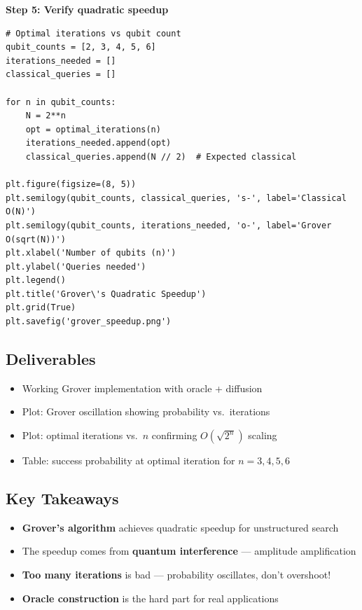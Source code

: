 \documentclass[11pt,a4paper]{article}
\begin{document}
\textbf{Step 5: Verify quadratic speedup}
\begin{lstlisting}
# Optimal iterations vs qubit count
qubit_counts = [2, 3, 4, 5, 6]
iterations_needed = []
classical_queries = []

for n in qubit_counts:
    N = 2**n
    opt = optimal_iterations(n)
    iterations_needed.append(opt)
    classical_queries.append(N // 2)  # Expected classical

plt.figure(figsize=(8, 5))
plt.semilogy(qubit_counts, classical_queries, 's-', label='Classical O(N)')
plt.semilogy(qubit_counts, iterations_needed, 'o-', label='Grover O(sqrt(N))')
plt.xlabel('Number of qubits (n)')
plt.ylabel('Queries needed')
plt.legend()
plt.title('Grover\'s Quadratic Speedup')
plt.grid(True)
plt.savefig('grover_speedup.png')
\end{lstlisting}

\subsection*{Deliverables}
\begin{itemize}
    \item[\checkmark] Working Grover implementation with oracle + diffusion
    \item[\checkmark] Plot: Grover oscillation showing probability vs.\ iterations
    \item[\checkmark] Plot: optimal iterations vs.\ $n$ confirming $O(\sqrt{2^n})$ scaling
    \item[\checkmark] Table: success probability at optimal iteration for $n = 3, 4, 5, 6$
\end{itemize}

\subsection*{Key Takeaways}
\begin{itemize}
    \item \textbf{Grover's algorithm} achieves quadratic speedup for unstructured search
    \item The speedup comes from \textbf{quantum interference} --- amplitude amplification
    \item \textbf{Too many iterations} is bad --- probability oscillates, don't overshoot!
    \item \textbf{Oracle construction} is the hard part for real applications
\end{itemize}


\end{document}
